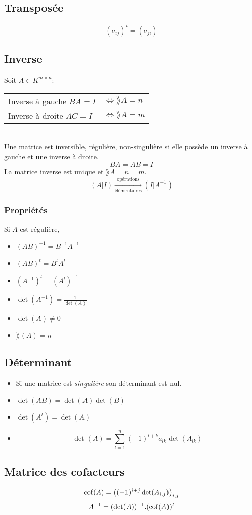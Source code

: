 \subsection{Transposée}
\[(a_{ij})^t = (a_{ji})\]

\subsection{Inverse}
Soit $A\in K^{m \times n}$:\\
\begin{tabular}{ll}
	Inverse à gauche $BA = I$ & $\Leftrightarrow \rang A  = n$\\
	Inverse à droite $AC = I$ & $\Leftrightarrow \rang A  = m$
\end{tabular}\\
Une matrice est inversible, régulière, non-singulière si elle possède un inverse à gauche et une inverse à droite.
\[BA = AB = I\]
La matrice inverse est unique et $\rang A = n = m$.
\[(A|I) \xrightarrow[\textrm{élémentaires}]{\textrm{opérations}} (I|A^{-1})\]
\subsubsection{Propriétés}
Si $A$ est régulière,
\begin{itemize}
\item $(AB)^{-1} = B^{-1}A^{-1}$
\item $(AB)^t = B^tA^t$
\item $(A^{-1})^t = (A^t)^{-1}$
\item $\det(A^{-1}) = \frac{1}{\det(A)}$
\item $\det(A) \neq 0$
\item $\rang(A) = n$
\end{itemize}

\subsection{Déterminant}
\begin{itemize}
\item Si une matrice est \emph{singulière} son déterminant est nul.
\item $\det(AB) = \det(A) \det(B)$
\item $\det(A^t) = \det(A)$
\item \[\det(A) = \sum_{l = 1}^{n}(-1)^{l+k}a_{lk}\det(A_{lk})\]
\end{itemize}

\subsection{Matrice des cofacteurs}
\[\operatorname{cof}(A) = \left((-1)^{i + j}\det(A_{i,j})\right)_{i,j}\]
\[A^{-1} = (\det(A))^{-1} . (\operatorname{cof}(A))^t\]


